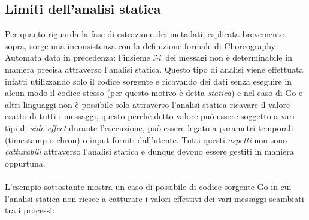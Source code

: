 \subsection{Limiti dell'analisi statica} \label{subsec:Static_Analysis_Limits}
Per quanto riguarda la fase di estrazione dei metadati, esplicata brevemente sopra, sorge una inconsistenza con la definizione formale di Choreography Automata data in precedenza: l'insieme $\mathcal{M}$ dei messagi non è determinabile in maniera precisa attraverso l'analisi statica.
Questo tipo di analisi viene effettuata infatti utilizzando solo il codice sorgente e ricavando dei dati senza eseguire in alcun modo il codice stesso (per questo motivo è detta \emph{statica}) e nel caso di Go e altri linguaggi non è possibile solo attraverso l'analisi statica ricavare il valore esatto di tutti i messaggi, questo perchè detto valore può essere soggetto a vari tipi di \emph{side effect} durante l'esecuzione, può essere legato a parametri temporali (timestamp o chron) o input forniti dall'utente. Tutti questi \emph{aspetti}  non sono \emph{catturabili}\cite{Static_Analysis} attraverso l'analisi statica e dunque devono essere  gestiti in maniera oppurtuna.\\ \\
L'esempio sottostante mostra un caso di possibile di codice sorgente Go in cui l'analisi statica non riesce a catturare i valori effettivi dei vari messaggi scambiati tra i processi:

